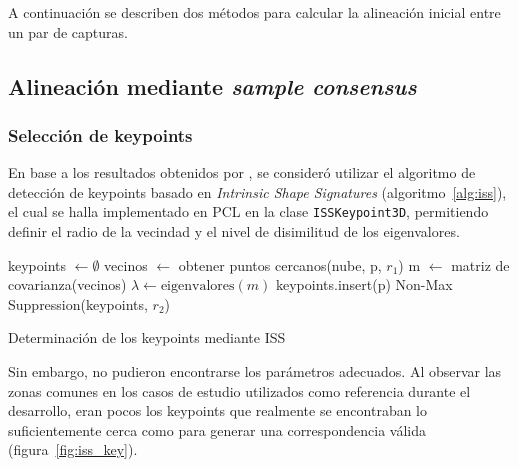 	A continuación se describen dos métodos para calcular la alineación inicial entre un par de capturas.

	\subsection{Alineación mediante \emph{sample consensus}}
		\subsubsection{Selección de keypoints}
			En base a los resultados obtenidos por \cite{ISS},
			se consideró utilizar el algoritmo de detección de keypoints basado en \emph{Intrinsic Shape Signatures} (algoritmo~\ref{alg:iss}),
			el cual se halla implementado en PCL en la clase \texttt{ISSKeypoint3D}, permitiendo
			definir el radio de la vecindad y el nivel de disimilitud de los eigenvalores.

			\begin{algorithm}
				\begin{algorithmic}[1]
						\State keypoints $\gets\emptyset$
							\State vecinos $\gets$ obtener puntos cercanos(nube, p, $r_1$)
							\State m $\gets$ matriz de covarianza(vecinos)
							\State $\lambda\gets\text{eigenvalores}(m)$
								\State keypoints.insert(p)
							\EndIf
						\EndFor
						\State\Return Non-Max Suppression(keypoints, $r_2$)
					\EndFunction
				\end{algorithmic}
				\caption[Determinación de los keypoints mediante ISS]{\label{alg:iss}Determinación de los keypoints mediante ISS}
			\end{algorithm}

			Sin embargo, no pudieron encontrarse los parámetros adecuados.
			Al observar las zonas comunes en los casos de estudio
			utilizados como referencia durante el desarrollo,
			eran pocos los keypoints que
			realmente se encontraban lo suficientemente cerca como para generar
			una correspondencia válida (figura~\ref{fig:iss_key}).


